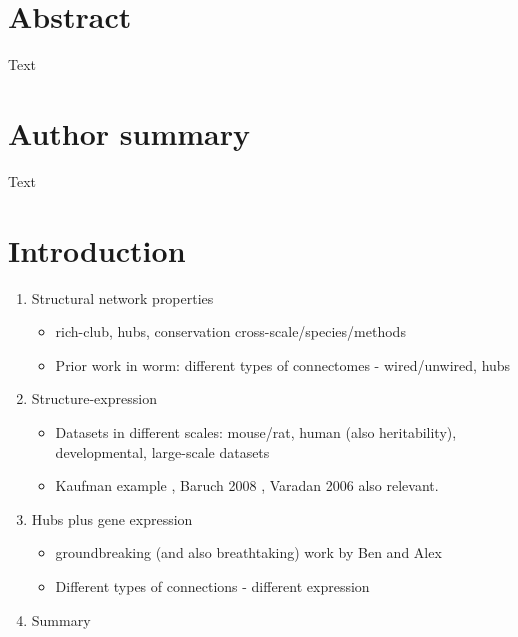 \documentclass[10pt,letterpaper]{article}
\begin{document}
\section*{Abstract}
Text


\section*{Author summary}
Text

\linenumbers

\section*{Introduction}

\begin{enumerate}
    \item{Structural network properties}
    \begin{itemize}
    \item{rich-club, hubs, conservation cross-scale/species/methods}
    \item{Prior work in worm: different types of connectomes - wired/unwired, hubs}
    \end{itemize}    

    \item{Structure-expression}
    \begin{itemize}
    \item{Datasets in different scales: mouse/rat, human (also heritability), developmental, large-scale datasets}
    \item{Kaufman example \cite{Kaufman2006}, Baruch 2008 \cite{Baruch2008b}, Varadan 2006 \cite{Varadan2006} also relevant.}
    \end{itemize}  
    
    \item{Hubs plus gene expression}
    \begin{itemize}
    \item{groundbreaking (and also breathtaking) work by Ben and Alex \cite{Fulcher2015}}
    \item{Different types of connections - different expression}
    \end{itemize}  
    \item{Summary}
    
 \end{enumerate}
\end{document}
